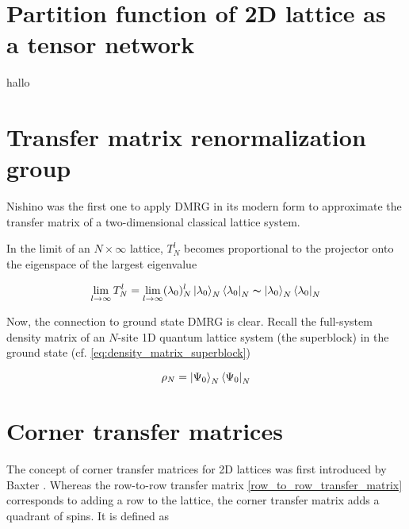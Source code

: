 \section{Partition function of 2D lattice as a tensor network}

hallo


\section{Transfer matrix renormalization group}

Nishino \cite{nishino1995density} was the first one to apply DMRG in its modern
form to approximate the transfer matrix of a two-dimensional classical lattice system.

In the limit of an $N \times \infty$ lattice, $T_{N}^{l}$ becomes proportional
to the projector onto the eigenspace of the largest eigenvalue

\begin{equation}
  \lim_{l \to \infty} T_{N}^{l} = \lim_{l \to \infty} (\lambda_0)_{N}^{l} \ket{\lambda_0}_{N}\bra{\lambda_0}_{N} \thicksim \ket{\lambda_0}_{N}\bra{\lambda_0}_N
\end{equation}

Now, the connection to ground state DMRG is clear. Recall the full-system
density matrix of an $N$-site 1D quantum lattice system (the superblock) in the
ground state (cf. \eqref{eq:density_matrix_superblock})

\begin{equation}
  \rho_N = \ket{\Psi_0}_{N}\bra{\Psi_0}_{N}
\end{equation}





\section{Corner transfer matrices}

The concept of corner transfer matrices for 2D lattices was first introduced by
Baxter \cite{baxter1968dimers, baxter1978variational, baxter1982exactly}.
Whereas the row-to-row transfer matrix \eqref{row_to_row_transfer_matrix}
corresponds to adding a row to the lattice, the corner transfer matrix adds
a quadrant of spins. It is defined as

